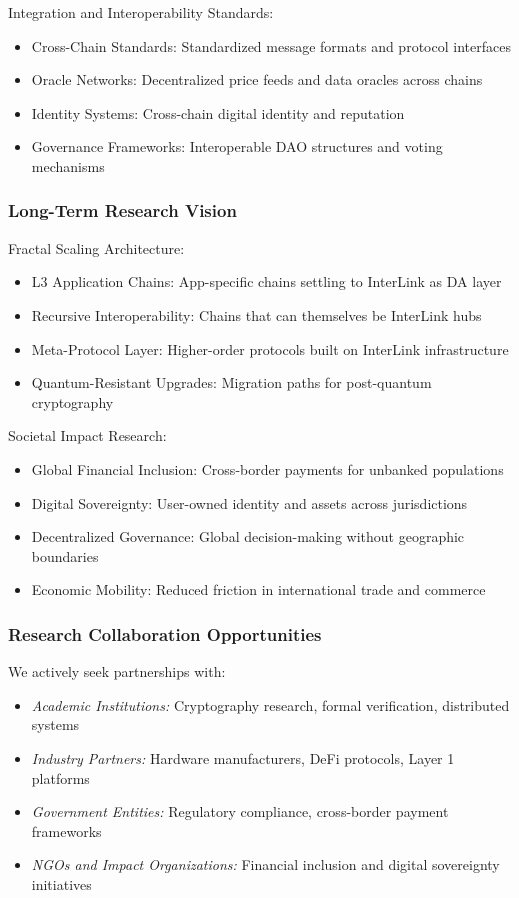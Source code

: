 \documentclass[11pt,a4paper]{article}
\begin{document}
Integration and Interoperability Standards:
\begin{itemize}
    \item Cross-Chain Standards: Standardized message formats and protocol interfaces
    \item Oracle Networks: Decentralized price feeds and data oracles across chains
    \item Identity Systems: Cross-chain digital identity and reputation
    \item Governance Frameworks: Interoperable DAO structures and voting mechanisms
\end{itemize}

\subsubsection{Long-Term Research Vision}

Fractal Scaling Architecture:
\begin{itemize}
    \item L3 Application Chains: App-specific chains settling to InterLink as DA layer
    \item Recursive Interoperability: Chains that can themselves be InterLink hubs
    \item Meta-Protocol Layer: Higher-order protocols built on InterLink infrastructure
    \item Quantum-Resistant Upgrades: Migration paths for post-quantum cryptography
\end{itemize}

Societal Impact Research:
\begin{itemize}
    \item Global Financial Inclusion: Cross-border payments for unbanked populations
    \item Digital Sovereignty: User-owned identity and assets across jurisdictions
    \item Decentralized Governance: Global decision-making without geographic boundaries
    \item Economic Mobility: Reduced friction in international trade and commerce
\end{itemize}

\subsubsection{Research Collaboration Opportunities}

We actively seek partnerships with:
\begin{itemize}
    \item \textit{Academic Institutions:} Cryptography research, formal verification, distributed systems
    \item \textit{Industry Partners:} Hardware manufacturers, DeFi protocols, Layer 1 platforms
    \item \textit{Government Entities:} Regulatory compliance, cross-border payment frameworks
    \item \textit{NGOs and Impact Organizations:} Financial inclusion and digital sovereignty initiatives
\end{itemize}
\end{document}
